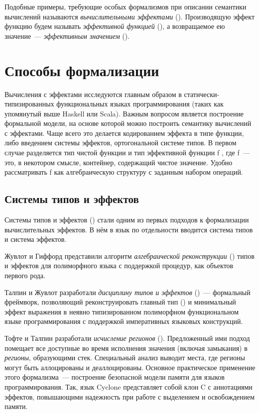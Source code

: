 Подобные примеры, требующие особых формализмов при описании семантики вычислений называются \emph{вычислительными эффектами} (). Производящую эффект функцию будем называть \emph{эффективной функцией} (), а возвращаемое ею значение~--- \emph{эффективным значением} ().

\section{Способы формализации}
Вычисления с эффектами исследуются главным образом в статически-типизированных функциональных языках программирования (таких как упомянутый выше Haskell или Scala\cite{Odersky2004}). Важным вопросом является построение формальной модели, на основе которой можно построить семантику вычислений с эффектами. Чаще всего это делается кодированием эффекта в типе функции, либо введением системы эффектов, ортогональной системе типов. В первом случае разделяется тип чистой функции \<\alpha \to \beta\> и тип эффективной функции \<\alpha \to f \beta\>, где \<f\>~--- это, в некотором смысле, контейнер, содержащий чистое значение. Удобно рассматривать \<f\> как алгебраическую структуру\cite{Staton2013} с заданным набором операций.

\subsection{Системы типов и эффектов}
Системы типов и эффектов () стали одним из первых подходов к формализации вычислительных эффектов. В нём в язык по отдельности вводится система типов и система эффектов. 

Жувлот и Гиффорд\cite{Jouvelot1991} представили алгоритм \emph{алгебраической реконструкции} () типов и эффектов для полиморфного языка с поддержкой процедур, как объектов первого рода.

Талпин и Жувлот\cite{Talpin1992} разработали \emph{дисциплину типов и эффектов} ()~--- формальный фреймворк, позволяющий реконструировать главный тип () и минимальный эффект выражения в неявно типизированном полиморфном функциональном языке программирования с поддержкой императивных языковых конструкций.

Тофте и Талпин\cite{Tofte1994,tofte1997region} разработали \emph{исчисление регионов} (). Предложенный ими подход помещает все доступные во время исполнения значения (включая замыкания) в \emph{регионы}, образующими стек. Специальный анализ выводит места, где регионы могут быть аллоцированы и деаллоцированы. Основное практическое применение этого формализма~--- построение безопасной модели памяти для языков программирования. Так, язык Cyclone\cite{Jim2002} представляет собой клон C с аннотациями эффектов, повышающими надежность при работе с выделением и освобождением памяти.

